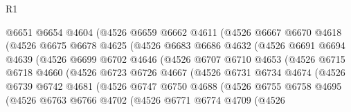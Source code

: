 \begin{lexlean}{R1}
\begin{coremodule}
                    @6651
                    @6654
                    @4604
                    (@4526
                      @6659
                      @6662
                      @4611
                      (@4526
                        @6667
                        @6670
                        @4618
                        (@4526
                          @6675
                          @6678
                          @4625
                          (@4526
                            @6683
                            @6686
                            @4632
                            (@4526
                              @6691
                              @6694
                              @4639
                              (@4526
                                @6699
                                @6702
                                @4646
                                (@4526
                                  @6707
                                  @6710
                                  @4653
                                  (@4526
                                    @6715
                                    @6718
                                    @4660
                                    (@4526
                                      @6723
                                      @6726
                                      @4667
                                      (@4526
                                        @6731
                                        @6734
                                        @4674
                                        (@4526
                                          @6739
                                          @6742
                                          @4681
                                          (@4526
                                            @6747
                                            @6750
                                            @4688
                                            (@4526
                                              @6755
                                              @6758
                                              @4695
                                              (@4526
                                                @6763
                                                @6766
                                                @4702
                                                (@4526
                                                  @6771
                                                  @6774
                                                  @4709
                                                  (@4526

\end{coremodule}
\end{lexlean}
